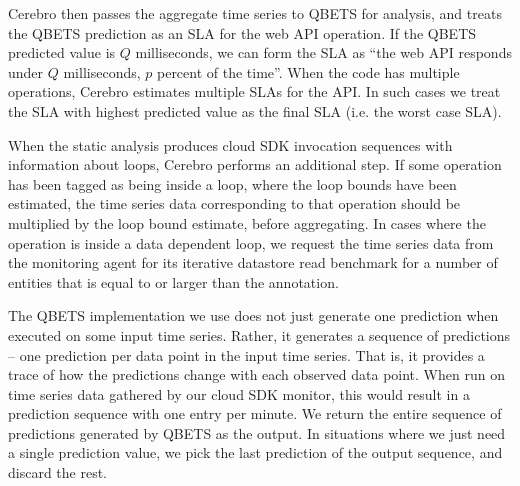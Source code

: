 Cerebro then passes the aggregate time series to QBETS for analysis, and
treats the QBETS prediction as an SLA for the web API operation.
If the QBETS predicted value is $Q$ milliseconds, 
we can form the SLA as ``the web API responds 
under $Q$ milliseconds, $p$ percent of the time''. 
When the code has multiple operations, Cerebro estimates multiple SLAs for the API. In
such cases we treat the SLA with highest predicted value 
as the final SLA (i.e. the worst case SLA).

When the static analysis produces cloud SDK invocation 
sequences with information about loops, Cerebro performs an additional step.
If some operation has been tagged as being inside a loop, where the loop
bounds have been estimated, the time series data corresponding to that 
operation should be multiplied 
by the loop bound estimate, before aggregating. In cases where the operation 
is inside a data dependent loop, we request the time series data from 
the monitoring agent for its iterative datastore read benchmark 
for a number of entities that is equal to or larger than the annotation. 

The QBETS implementation we use does not just generate one prediction when executed on
some input time series. Rather, it generates a sequence of predictions -- one prediction per data point in the input
time series. That is, it provides a trace of how the predictions change with each observed data point.
When run on time series data gathered by our cloud SDK monitor,
this would result in a prediction sequence with one entry per minute.
We return the entire sequence of predictions generated by QBETS
as the output. In situations where we just need a single prediction value, we pick the last prediction of the output
sequence, and discard the rest.